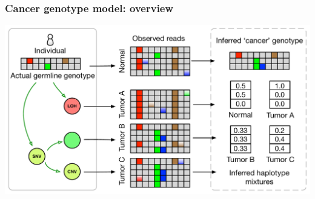 \documentclass{beamer}
\begin{document}
\begin{frame}
\frametitle{Cancer genotype model: overview}

\begin{center}
\includegraphics[width=\linewidth]{images/cancer_calling}
\end{center}

\end{frame}

\end{document}
